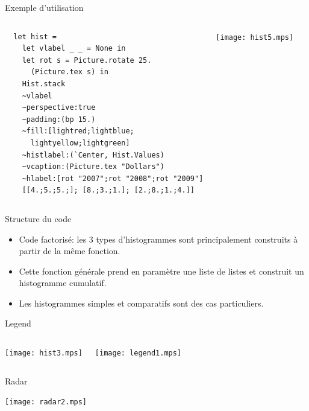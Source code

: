 \documentclass{beamer}
\begin{document}
\begin{frame}[fragile]{Exemple d'utilisation}
\begin{columns}
  \begin{center}\footnotesize{
\begin{verbatim}
  let hist =
    let vlabel _ _ = None in
    let rot s = Picture.rotate 25. 
      (Picture.tex s) in
    Hist.stack
    ~vlabel
    ~perspective:true 
    ~padding:(bp 15.)
    ~fill:[lightred;lightblue;
      lightyellow;lightgreen]
    ~histlabel:(`Center, Hist.Values)
    ~vcaption:(Picture.tex "Dollars")
    ~hlabel:[rot "2007";rot "2008";rot "2009"]
    [[4.;5.;5.;]; [8.;3.;1.]; [2.;8.;1.;4.]]
\end{verbatim}}
      \end{center}
    
    \begin{center}
      \texttt{[image: hist5.mps]}
    \end{center}
  \end{columns}
\end{frame}
    
\begin{frame}{Structure du code}
  \begin{itemize}
  \item Code factorisé: les 3 types d'histogrammes sont principalement construits à partir de la même fonction.
  
  \bigskip
  \item Cette fonction générale prend en paramètre une liste de listes et construit un histogramme cumulatif.
  
  \bigskip
  \item Les histogrammes simples et comparatifs sont des cas particuliers.
  \end{itemize}
\end{frame}


\begin{frame}{Legend}
  \begin{columns}
    \begin{center}
      \texttt{[image: hist3.mps]}
    \end{center}
     \texttt{[image: legend1.mps]}
  \end{columns}
\end{frame}

\begin{frame}{Radar}
  \begin{center}
    \texttt{[image: radar2.mps]}
  \end{center}
\end{frame}
\end{document}
